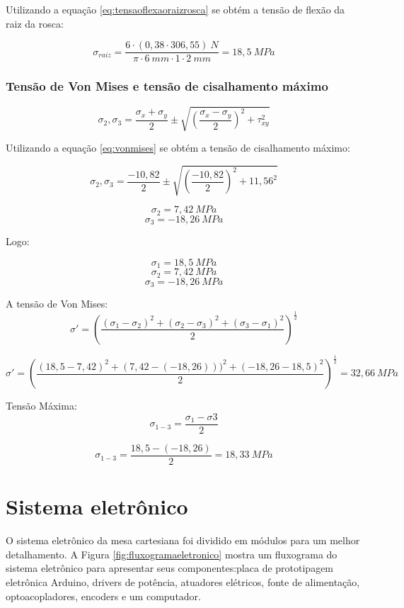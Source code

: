 Utilizando a equação \ref{eq:tensaoflexaoraizrosca} se obtém a tensão de flexão da raiz da rosca:

$$\sigma_{raiz} = \frac{6 \cdot (0,38 \cdot 306,55)~N}{\pi \cdot 6~mm \cdot 1 \cdot 2~mm} = 18,5~MPa$$

\subsubsection{Tensão de Von Mises e tensão de cisalhamento máximo}

\begin{equation}\label{eq:vonmises}
\sigma_{2}, \sigma_{3} = \frac{\sigma_{x} + \sigma_{y}}{2} \pm \sqrt{(\frac{\sigma_{x} - \sigma_{y}}{2})^2 + \tau_{xy}^{2}}
\end{equation}

Utilizando a equação \ref{eq:vonmises} se obtém a tensão de cisalhamento máximo:

$$\sigma_{2}, \sigma_{3} = \frac{-10,82}{2} \pm \sqrt{(\frac{-10,82}{2})^2 + 11,56^{2}}$$

$$\sigma_{2} = 7,42~MPa$$
$$\sigma_{3} = -18,26~MPa$$

Logo:

$$\sigma_{1} = 18,5~MPa$$
$$\sigma_{2} = 7,42~MPa$$
$$\sigma_{3} = -18,26~MPa$$

A tensão de Von Mises:
\begin{equation}
\sigma' = (\frac{(\sigma_{1} - \sigma_{2})^{2} + (\sigma_{2} - \sigma_{3})^{2} + (\sigma_{3} - \sigma_{1})^{2}}{2})^{\frac{1}{2}}
\end{equation}

$$\sigma' = (\frac{(18,5 - 7,42)^{2} + (7,42 - (-18,26)))^{2} + (-18,26 - 18,5)^{2}}{2})^{\frac{1}{2}} = 32,66~MPa$$

Tensão Máxima:
\begin{equation}\label{eq:tensaomaxima}
\sigma_{1-3} = \frac{\sigma_{1} - \sigma{3}}{2}
\end{equation}

$$\sigma_{1-3} = \frac{18,5 - (-18,26)}{2} = 18,33~MPa$$

\section{Sistema eletrônico}\label{sec:metsisele}

O sistema eletrônico da mesa cartesiana foi dividido em módulos para um melhor detalhamento.
A Figura \ref{fig:fluxogramaeletronico} mostra um fluxograma do sistema eletrônico para apresentar 
seus componentes:placa de prototipagem eletrônica Arduino, drivers de potência, atuadores elétricos, 
fonte de alimentação, optoacopladores, encoders e um computador.


